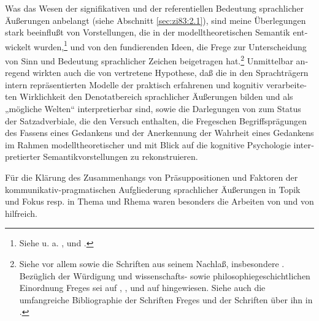 \documentclass[output=paper]{langscibook}
\begin{document}
\begin{otherlanguage}{german}
\largerpage
Was das Wesen der signifikativen und der referentiellen Bedeutung sprachlicher Äußerungen anbelangt (siehe Abschnitt \ref{sec:zi83:2.1}), sind meine Überlegungen stark beeinflußt von Vorstellungen, die in der modelltheoretischen Semantik ent\-wi\-ckelt wurden,\footnote{Siehe u. a. \citet{montague1973the-proper-treatment-of-quantification-in-ordinary-english}, \citet{lewis1970general-semantics} und \citet{cresswell1973logics-and-languages}.} und von den fundierenden Ideen, die Frege zur Unterscheidung von Sinn und Bedeutung sprachlicher Zeichen beigetragen hat.\footnote{Siehe vor allem \citet{frege1892uber-sinn-und-bedeutung, frege1918der-gedanke.-eine-logische-untersuchung-in:-beitrage-zur-philosophie-des-deutschen-idealismus-i-1918/1919} sowie die Schriften aus seinem Nachlaß, insbesondere \citet{frege1897logik, frege1906einleitung-in-die-logik}. \\ Bezüglich der Würdigung und wissenschafts- sowie philosophiegeschichtlichen Einordnung Freges sei auf \citet{birjukov1959o-robotach-g.-frage-po-filosofskim-voprosam-matematiki, birjukov1960teorija-smysla-gotloba-frege, birjukov1965o-vzgljadach-g.-frege-na-rol-znakov-i-iscislenija-v-poznanii}, \citet{rieske1968philosophische-aspekte-der-fregeschen-begrundung-der-modernen-logik.-zur-120.-wiederkehr-des-geburtstages-von-g.-frege}, \citet{kreiser1973geschichte-und-logisch-semantische-probleme-des-wissenschaftlichen-werkes-freges} und auf \citet{kozlova1972filosofija-i-jazyk-kriticeskij-analiz-nekotorych-tendencij-evoljucii-pozitivizma-xx-v.} hingewiesen. Siehe auch die umfangreiche Bibliographie der Schriften Freges und der Schriften über ihn in \citet[270-298]{frege1973schriften-zur-logik.-aus-dem-nachlass-von-l.-kreiser}.} Unmittelbar anregend wirkten auch die von \citet{Bierwisch80Semantic-structure,bierwisch1974utterance-meaning-and-mental-states} vertretene Hypothese, daß die in den Sprachträgern intern repräsentierten Modelle der praktisch erfahrenen und kognitiv verarbeiteten Wirklichkeit den Denotatbereich sprach\-li\-cher Äußerungen bilden und als „mögliche Welten“ interpretierbar sind, sowie die Darlegungen von \citet{lang1979zum-status-der-satzadverbiale} zum Status der Satzadverbiale, die den Versuch enthalten, die Fregeschen Begriffsprägungen des Fassens eines Gedankens und der Anerkennung der Wahrheit eines Gedankens im Rahmen mo\-dell\-theo\-re\-ti\-scher und mit Blick auf die kognitive Psychologie interpretierter Semantikvorstellungen zu rekonstruieren.

Für die Klärung des Zusammenhangs von Präsuppositionen und Faktoren der kommunikativ-pragmatischen Aufgliederung sprachlicher Äußerungen in Topik und Fokus resp. in Thema und Rhema waren besonders die Arbeiten von \citet{kiefer1978factivity-in-hungarian, kiefer1978functional-sentence-perspective-and-presuppositions} und von \citet{Pasch78Topik-vs., pasch1983mechanismen-der-inhaltlichen-gliederung-von-satzen} hilfreich.


\end{otherlanguage}
\end{document}
